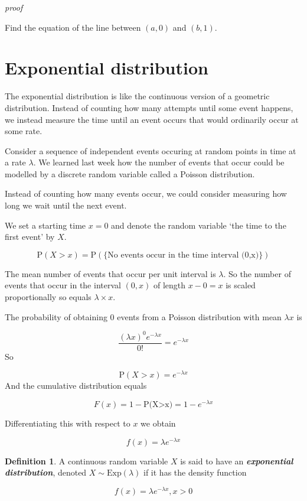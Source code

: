 \documentclass[
]{book}
\theoremstyle{definition}
\newtheorem{definition}{Definition}[chapter]
\theoremstyle{definition}
\theoremstyle{definition}
\theoremstyle{definition}
\theoremstyle{remark}
\begin{document}
\emph{proof}

Find the equation of the line between \((a,0)\) and \((b,1)\).

\hypertarget{exponential-distribution}{%
\section{Exponential distribution}\label{exponential-distribution}}

The exponential distribution is like the continuous version of a geometric distribution. Instead of counting how many attempts until some event happens, we instead measure the time until an event occurs that would ordinarily occur at some rate.

Consider a sequence of independent events occuring at random points in time at a rate \(\lambda\). We learned last week how the number of events that occur could be modelled by a discrete random variable called a Poisson distribution.

Instead of counting how many events occur, we could consider measuring how long we wait until the next event.

We set a starting time \(x=0\) and denote the random variable `the time to the first event' by \(X\).

\[\text{P}(X>x) = \text{P}( \{\text{No events occur in the time interval (0,x)}\})\]

The mean number of events that occur per unit interval is \(\lambda\). So the number of events that occur in the interval \((0,x)\) of length \(x-0 = x\) is scaled proportionally so equals \(\lambda \times x\).

The probability of obtaining \(0\) events from a Poisson distribution with mean \(\lambda x\) is

\[\frac{(\lambda x)^0 e^{-\lambda x}}{0!} = e^{-\lambda x}\]
So

\[\text{P}(X>x) =  e^{-\lambda x}\]
And the cumulative distribution equals

\[F(x) = 1-\text{P(X>x)}=1-e^{-\lambda x}\]

Differentiating this with respect to \(x\) we obtain

\[f(x) = \lambda e^{-\lambda x}\]

\begin{definition}
A continuous random variable \(X\) is said to have an \textbf{\emph{exponential distribution}}, denoted \(X\sim \text{Exp}(\lambda)\) if it has the density function

\[f(x) = \lambda e^{-\lambda x} , x >0\]
\end{definition}
\end{document}
